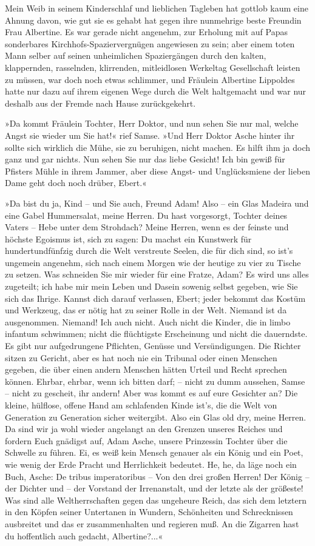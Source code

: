 Mein Weib in seinem Kinderschlaf und lieblichen Tagleben hat
gottlob kaum eine Ahnung davon, wie gut sie es gehabt hat gegen
ihre nunmehrige beste Freundin Frau Albertine. Es war gerade nicht
angenehm, zur Erholung mit auf Papas sonderbares
Kirchhofs-Spaziervergnügen angewiesen zu sein; aber einem toten
Mann selber auf seinen unheimlichen Spaziergängen durch den kalten,
klappernden, rasselnden, klirrenden, mitleidlosen Werkeltag
Gesellschaft leisten zu müssen, war doch noch etwas schlimmer, und
Fräulein Albertine Lippoldes hatte nur dazu auf ihrem eigenen Wege
durch die Welt haltgemacht und war nur deshalb aus der Fremde nach
Hause zurückgekehrt.

»Da kommt Fräulein Tochter, Herr Doktor, und nun sehen Sie nur mal,
welche Angst sie wieder um Sie hat!« rief Samse. »Und Herr Doktor
Asche hinter ihr sollte sich wirklich die Mühe, sie zu beruhigen,
nicht machen. Es hilft ihm ja doch ganz und gar nichts. Nun sehen
Sie nur das liebe Gesicht! Ich bin gewiß für Pfisters Mühle in
ihrem Jammer, aber diese Angst- und Unglücksmiene der lieben Dame
geht doch noch drüber, Ebert.«

»Da bist du ja, Kind – und Sie auch, Freund Adam! Also – ein Glas
Madeira und eine Gabel Hummersalat, meine Herren. Du hast
vorgesorgt, Tochter deines Vaters – Hebe unter dem Strohdach? Meine
Herren, wenn es der feinste und höchste Egoismus ist, sich zu
sagen: Du machst ein Kunstwerk für hundertundfünfzig durch die Welt
verstreute Seelen, die für dich sind, so ist's ungemein angenehm,
sich nach einem Morgen wie der heutige zu vier zu Tische zu setzen.
Was schneiden Sie mir wieder für eine Fratze, Adam? Es wird uns
alles zugeteilt; ich habe mir mein Leben und Dasein sowenig selbst
gegeben, wie Sie sich das Ihrige. Kannst dich darauf verlassen,
Ebert; jeder bekommt das Kostüm und Werkzeug, das er nötig hat zu
seiner Rolle in der Welt. Niemand ist da ausgenommen. Niemand! Ich
auch nicht. Auch nicht die Kinder, die in limbo infantum schwimmen;
nicht die flüchtigste Erscheinung und nicht die dauerndste. Es gibt
nur aufgedrungene Pflichten, Genüsse und Versündigungen. Die
Richter sitzen zu Gericht, aber es hat noch nie ein Tribunal oder
einen Menschen gegeben, die über einen andern Menschen hätten
Urteil und Recht sprechen können. Ehrbar, ehrbar, wenn ich bitten
darf; – nicht zu dumm aussehen, Samse – nicht zu gescheit, ihr
andern! Aber was kommt es auf eure Gesichter an? Die kleine,
hülflose, offene Hand am schlafenden Kinde ist's, die die Welt von
Generation zu Generation sicher weitergibt. Also ein Glas old dry,
meine Herren. Da sind wir ja wohl wieder angelangt an den Grenzen
unseres Reiches und fordern Euch gnädigst auf, Adam Asche, unsere
Prinzessin Tochter über die Schwelle zu führen. Ei, es weiß kein
Mensch genauer als ein König und ein Poet, wie wenig der Erde
Pracht und Herrlichkeit bedeutet. He, he, da läge noch ein Buch,
Asche: De tribus imperatoribus – Von den drei großen Herren! Der
König – der Dichter und – der Vorstand der Irrenanstalt, und der
letzte als der größeste! Was sind alle Weltherrschaften gegen das
ungeheure Reich, das sich dem letztern in den Köpfen seiner
Untertanen in Wundern, Schönheiten und Schrecknissen ausbreitet und
das er zusammenhalten und regieren muß. An die Zigarren hast du
hoffentlich auch gedacht, Albertine?...«

